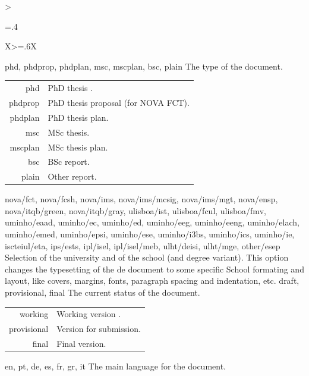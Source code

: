 \bgroup
\begin{xltabular}{\linewidth}{>{\hsize=.4\hsize\raggedright\arraybackslash}X>{\hsize=.6\hsize}X}
  \toprule
    {phd, phdprop, phdplan, msc, mscplan, bsc, plain}%
    {The type of the document.}%
	{%
    \begin{tabular}{@{}r@{ $\rightarrow$ }l@{}}
        phd & PhD thesis .\\
    phdprop & PhD thesis proposal (for NOVA FCT).\\
    phdplan & PhD thesis plan.\\
        msc & MSc thesis.\\
    mscplan & MSc thesis plan.\\
        bsc & BSc report.\\
      plain & Other report.\\
    \end{tabular}
    }
    \midrule
  	{nova/fct, nova/fcsh, nova/ims, nova/ims/mcsig, nova/ims/mgt, nova/ensp, nova/itqb/green, nova/itqb/gray,
ulisboa/ist, ulisboa/fcul, ulisboa/fmv,
uminho/eaad, uminho/ec, uminho/ed, uminho/eeg, uminho/eeng, uminho/elach, uminho/emed, uminho/epsi, uminho/ese, uminho/i3bs, uminho/ics, uminho/ie, 
iscteiul/eta, 
ips/ests, 
ipl/isel, ipl/isel/meb,
ulht/deisi, ulht/mge, 
other/esep
	}%
    {Selection of the university and of the school (and degree variant).}%
    { 
     This option changes the typesetting of the de document to some specific School formating and layout, like covers, margins, fonts, paragraph spacing and indentation, etc.}
    \midrule
    {draft, provisional, final}%
    {The current status of the document.}%
	{%
    \begin{tabular}{@{}r@{ $\rightarrow$ }X@{}}
         working      & Working version .\\
         provisional  & Version for submission.\\
         final        & Final version.\\
    \end{tabular}
    }
    \midrule
    {en, pt, de, es, fr, gr, it}%
    {The main language for the document.}%
	{%
    \begin{tabular}{@{}l@{ $\rightarrow$ }X@{}}

\end{tabular}}
\end{xltabular}
